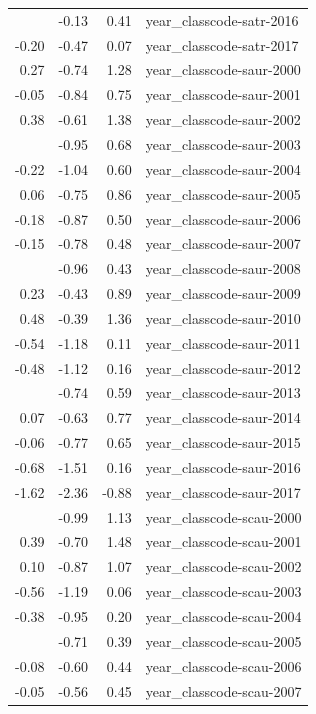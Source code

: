 \documentclass[]{article}
\begin{document}
\begin{longtable}[t]{rrrl}
\addlinespace
0.14 & -0.13 & 0.41 & year\_classcode-satr-2016\\
-0.20 & -0.47 & 0.07 & year\_classcode-satr-2017\\
0.27 & -0.74 & 1.28 & year\_classcode-saur-2000\\
-0.05 & -0.84 & 0.75 & year\_classcode-saur-2001\\
0.38 & -0.61 & 1.38 & year\_classcode-saur-2002\\
\addlinespace
-0.14 & -0.95 & 0.68 & year\_classcode-saur-2003\\
-0.22 & -1.04 & 0.60 & year\_classcode-saur-2004\\
0.06 & -0.75 & 0.86 & year\_classcode-saur-2005\\
-0.18 & -0.87 & 0.50 & year\_classcode-saur-2006\\
-0.15 & -0.78 & 0.48 & year\_classcode-saur-2007\\
\addlinespace
-0.27 & -0.96 & 0.43 & year\_classcode-saur-2008\\
0.23 & -0.43 & 0.89 & year\_classcode-saur-2009\\
0.48 & -0.39 & 1.36 & year\_classcode-saur-2010\\
-0.54 & -1.18 & 0.11 & year\_classcode-saur-2011\\
-0.48 & -1.12 & 0.16 & year\_classcode-saur-2012\\
\addlinespace
-0.07 & -0.74 & 0.59 & year\_classcode-saur-2013\\
0.07 & -0.63 & 0.77 & year\_classcode-saur-2014\\
-0.06 & -0.77 & 0.65 & year\_classcode-saur-2015\\
-0.68 & -1.51 & 0.16 & year\_classcode-saur-2016\\
-1.62 & -2.36 & -0.88 & year\_classcode-saur-2017\\
\addlinespace
0.07 & -0.99 & 1.13 & year\_classcode-scau-2000\\
0.39 & -0.70 & 1.48 & year\_classcode-scau-2001\\
0.10 & -0.87 & 1.07 & year\_classcode-scau-2002\\
-0.56 & -1.19 & 0.06 & year\_classcode-scau-2003\\
-0.38 & -0.95 & 0.20 & year\_classcode-scau-2004\\
\addlinespace
-0.16 & -0.71 & 0.39 & year\_classcode-scau-2005\\
-0.08 & -0.60 & 0.44 & year\_classcode-scau-2006\\
-0.05 & -0.56 & 0.45 & year\_classcode-scau-2007\\

\end{longtable}
\end{document}
